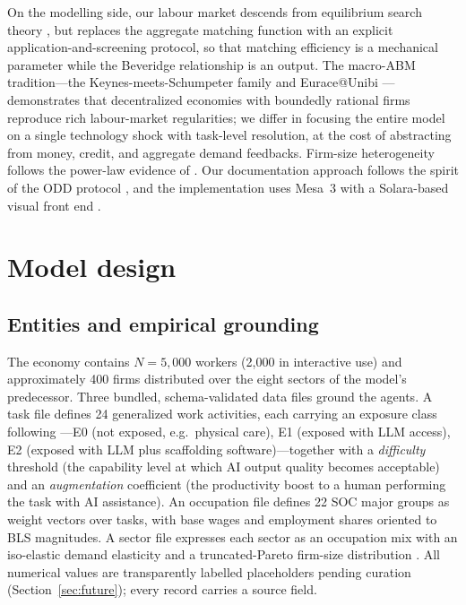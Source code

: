 \documentclass[11pt,a4paper]{article}
\begin{document}
On the modelling side, our labour market descends from equilibrium search theory
\citep{mortensen1994job, pissarides2000equilibrium}, but replaces the aggregate matching
function with an explicit application-and-screening protocol, so that matching
efficiency is a mechanical parameter while the Beveridge relationship
\citep{blanchard1989beveridge} is an output. The macro-ABM tradition---the
Keynes-meets-Schumpeter family \citep{dosi2010schumpeter, dosi2018labour} and
Eurace@Unibi \citep{dawid2018eurace}---demonstrates that decentralized economies with
boundedly rational firms reproduce rich labour-market regularities; we differ in
focusing the entire model on a single technology shock with task-level resolution, at
the cost of abstracting from money, credit, and aggregate demand feedbacks. Firm-size
heterogeneity follows the power-law evidence of \citet{axtell2001zipf}. Our documentation
approach follows the spirit of the ODD protocol \citep{grimm2020odd}, and the
implementation uses Mesa~3 \citep{terhoeven2025mesa} with a Solara-based visual front
end \citep{kazil2020mesa}.

\section{Model design}

\subsection{Entities and empirical grounding}

The economy contains $N=5{,}000$ workers (2{,}000 in interactive use) and approximately
400 firms distributed over the eight sectors of the model's predecessor. Three bundled,
schema-validated data files ground the agents. A task file defines 24 generalized work
activities, each carrying an exposure class following \citet{eloundou2024gpts}---E0
(not exposed, e.g.\ physical care), E1 (exposed with LLM access), E2 (exposed with LLM
plus scaffolding software)---together with a \emph{difficulty} threshold (the capability
level at which AI output quality becomes acceptable) and an \emph{augmentation}
coefficient (the productivity boost to a human performing the task with AI assistance).
An occupation file defines 22 SOC major groups as weight vectors over tasks, with base
wages and employment shares oriented to BLS magnitudes. A sector file expresses each
sector as an occupation mix with an iso-elastic demand elasticity and a truncated-Pareto
firm-size distribution \citep{axtell2001zipf}. All numerical values are transparently
labelled placeholders pending curation (Section~\ref{sec:future}); every record carries
a source field.
\end{document}
